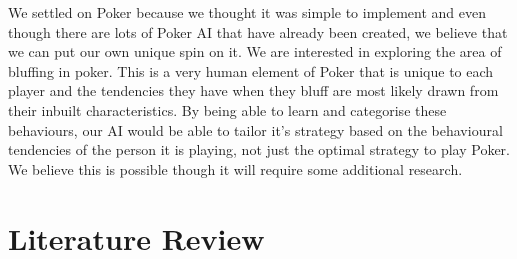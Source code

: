 \documentclass{article}
\begin{document}
\begin{multicols*}{2}
We settled on Poker because we thought it was simple to implement and even though there are lots of Poker AI that have already been created, we believe that we can put our own unique spin on it. We are interested in exploring the area of bluffing in poker. This is a very human element of Poker that is unique to each player and the tendencies they have when they bluff are most likely drawn from their inbuilt characteristics. By being able to learn and categorise these behaviours, our AI would be able to tailor it's strategy based on the behavioural tendencies of the person it is playing, not just the optimal strategy to play Poker. We believe this is possible though it will require some additional research.

\section{Literature Review}


\end{multicols*}
\end{document}
